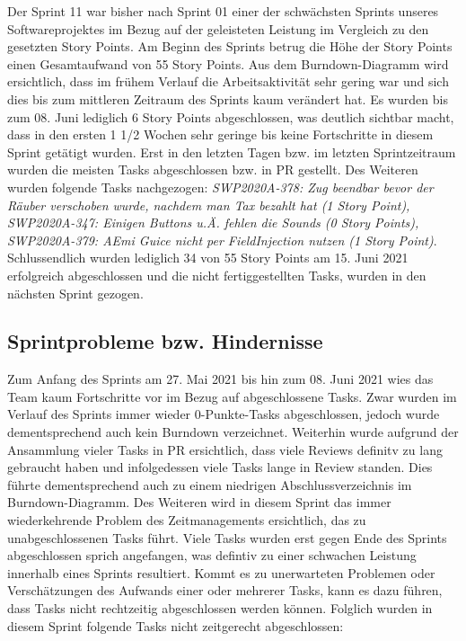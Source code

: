 \documentclass[12pt,a4paper, oneside]{article}
\begin{document}
\noindent
Der Sprint 11 war bisher nach Sprint 01 einer der schwächsten Sprints unseres Softwareprojektes im Bezug auf der geleisteten Leistung im Vergleich
zu den gesetzten Story Points. Am Beginn des Sprints betrug die Höhe der Story Points einen Gesamtaufwand von 55 Story Points.
Aus dem Burndown-Diagramm wird ersichtlich, dass im frühem Verlauf die Arbeitsaktivität sehr gering war und sich dies bis zum mittleren
Zeitraum des Sprints kaum verändert hat. Es wurden bis zum 08. Juni lediglich 6 Story Points abgeschlossen, was deutlich sichtbar macht, dass in den
ersten 1 1/2 Wochen sehr geringe bis keine Fortschritte in diesem Sprint getätigt wurden. Erst in den letzten Tagen bzw. im letzten Sprintzeitraum
wurden die meisten Tasks abgeschlossen bzw. in PR gestellt.
Des Weiteren wurden folgende Tasks nachgezogen: \textit{SWP2020A-378: Zug beendbar bevor der Räuber verschoben wurde, nachdem man Tax bezahlt hat (1 Story Point), SWP2020A-347: Einigen Buttons u.Ä. fehlen die Sounds (0 Story Points), SWP2020A-379: AEmi Guice nicht per FieldInjection nutzen (1 Story Point)}.
Schlussendlich wurden lediglich 34 von 55 Story Points am 15. Juni 2021 erfolgreich abgeschlossen und die nicht fertiggestellten Tasks,
wurden in den nächsten Sprint gezogen.

\newpage

\subsection{Sprintprobleme bzw. Hindernisse}

Zum Anfang des Sprints am 27. Mai 2021 bis hin zum 08. Juni 2021 wies das Team kaum Fortschritte vor im Bezug auf
abgeschlossene Tasks. Zwar wurden im Verlauf des Sprints immer wieder 0-Punkte-Tasks abgeschlossen, jedoch wurde
dementsprechend auch kein Burndown verzeichnet. Weiterhin wurde aufgrund der Ansammlung vieler Tasks in PR ersichtlich, dass viele Reviews definitv
zu lang gebraucht haben und infolgedessen viele Tasks lange in Review standen.
Dies führte dementsprechend auch zu einem niedrigen Abschlussverzeichnis im Burndown-Diagramm.
Des Weiteren wird in diesem Sprint das immer wiederkehrende Problem des Zeitmanagements ersichtlich, das zu unabgeschlossenen Tasks führt.
Viele Tasks wurden erst gegen Ende des Sprints abgeschlossen sprich angefangen, was defintiv zu einer schwachen Leistung innerhalb eines Sprints
resultiert. Kommt es zu unerwarteten Problemen oder Verschätzungen des Aufwands einer oder mehrerer Tasks, kann es dazu führen, dass Tasks nicht
rechtzeitig abgeschlossen werden können. Folglich wurden in diesem Sprint folgende Tasks nicht zeitgerecht abgeschlossen:
\end{document}
